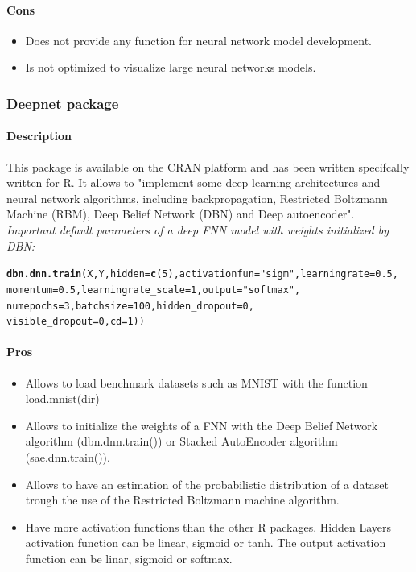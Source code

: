 \documentclass[letter]{article}\usepackage[]{graphicx}\usepackage[]{color}
\makeatletter
\newcommand{\hlstr}[1]{\textcolor[rgb]{0.192,0.494,0.8}{#1}}%
\newcommand{\hlkwd}[1]{\textcolor[rgb]{0.737,0.353,0.396}{\textbf{#1}}}%
\newenvironment{kframe}{%
 \def\at@end@of@kframe{}%
 \ifinner\ifhmode%
  \def\at@end@of@kframe{\end{minipage}}%
  \begin{minipage}{\columnwidth}%
 \fi\fi%
 \def\FrameCommand##1{\hskip\@totalleftmargin \hskip-\fboxsep
 \colorbox{shadecolor}{##1}\hskip-\fboxsep
     \hskip-\linewidth \hskip-\@totalleftmargin \hskip\columnwidth}%
 \MakeFramed {\advance\hsize-\width
   \@totalleftmargin\z@ \linewidth\hsize
   \@setminipage}}%
 {\par\unskip\endMakeFramed%
 \at@end@of@kframe}
\newenvironment{knitrout}{}{} %
\makeatother
\begin{document}
\paragraph{Cons}
\begin{itemize}
\item Does not provide any function for neural network model development.
\item Is not optimized to visualize large neural networks models.
\end{itemize}

\subsubsection{Deepnet package}
\paragraph{Description}
This package is available on the CRAN platform and has been written specifcally written for R. It allows to "implement some deep learning architectures and neural network algorithms, including backpropagation, Restricted Boltzmann Machine (RBM), Deep Belief Network (DBN) and Deep autoencoder".\\
\textit{Important default parameters of a deep FNN model with weights initialized by DBN:}
\begin{knitrout}
\color{fgcolor}\begin{kframe}
\begin{alltt}
\hlkwd{dbn.dnn.train}(X, Y, hidden=\hlkwd{c}(5), activationfun=\hlstr{"sigm"}, learningrate=0.5,
              momentum=0.5, learningrate_scale=1, output=\hlstr{"softmax"},
              numepochs = 3, batchsize = 100, hidden_dropout = 0, 
              visible_dropout = 0, cd = 1))
\end{alltt}
\end{kframe}
\end{knitrout}

\paragraph{Pros}
\begin{itemize}
\item Allows to load benchmark datasets such as MNIST with the function load.mnist(dir)
\item Allows to initialize the weights of a FNN with the Deep Belief Network algorithm (dbn.dnn.train()) or Stacked AutoEncoder algorithm (sae.dnn.train()).
\item Allows to have an estimation of the probabilistic distribution of a dataset trough the use of the Restricted Boltzmann machine algorithm.
\item Have more activation functions than the other R packages. Hidden Layers activation function can be linear, sigmoid or tanh. The output activation function can be linar, sigmoid or softmax.
\end{itemize}
\end{document}
